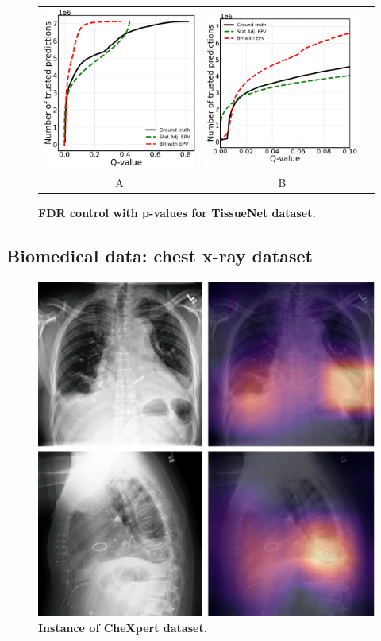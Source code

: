 \documentclass{article}
\begin{document}
\begin{figure}
	\centering
	\begin{tabular}{ccc}
 		\includegraphics[width=2in]{img/cnn_multi_sa_bcss_fdr_control.pdf} &
		\includegraphics[width=2in]{img/cnn_multi_sa_bcss_fdr_control_loc.pdf}  \\
		A & B 
	\end{tabular}
	\caption{\bf FDR control with p-values for TissueNet dataset.}
	\label{fig:pcam}
\end{figure}

\subsection{Biomedical data: chest x-ray dataset}

\begin{figure}
	\advance\leftskip-0.5cm
	\includegraphics[width=8in]{img/chexpert.jpg}
	\caption{{\bf Instance of CheXpert dataset.}}
	\label{fig:bcss_example}
\end{figure} 
\end{document}
